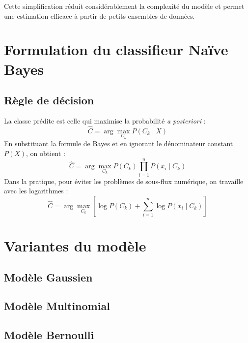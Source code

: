 \documentclass[12pt,a4paper]{article}
\begin{document}
Cette simplification réduit considérablement la complexité du modèle et permet une estimation efficace à partir de petits ensembles de données.

\newpage

\section{Formulation du classifieur Naïve Bayes}

\subsection{Règle de décision}
La classe prédite est celle qui maximise la probabilité \textit{a posteriori} :
\begin{equation}
    \hat{C} = \arg\max_{C_k} P(C_k \mid X)
\end{equation}
En substituant la formule de Bayes et en ignorant le dénominateur constant \( P(X) \), on obtient :
\begin{equation}
    \hat{C} = \arg\max_{C_k} P(C_k) \prod_{i=1}^{n} P(x_i \mid C_k)
\end{equation}
Dans la pratique, pour éviter les problèmes de sous-flux numérique, on travaille avec les logarithmes :
\begin{equation}
    \hat{C} = \arg\max_{C_k} \left[ \log P(C_k) + \sum_{i=1}^{n} \log P(x_i \mid C_k) \right]
\end{equation}

\section{Variantes du modèle}

\subsection{Modèle Gaussien}
\subsection{Modèle Multinomial}
\subsection{Modèle Bernoulli}
\end{document}
